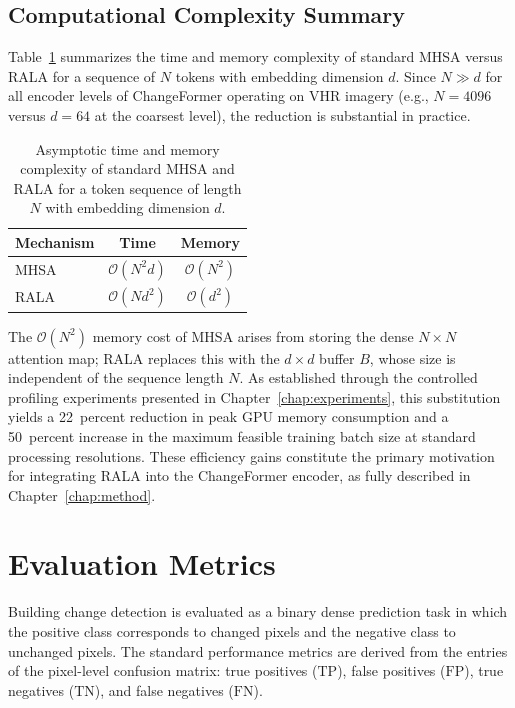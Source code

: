 \subsection{Computational Complexity Summary}

Table~\ref{tab:complexity} summarizes the time and memory complexity of standard \ac{MHSA} versus \ac{RALA} for a sequence of $N$ tokens with embedding dimension $d$. Since $N \gg d$ for all encoder levels of ChangeFormer operating on \ac{VHR} imagery (e.g., $N = 4096$ versus $d = 64$ at the coarsest level), the reduction is substantial in practice.

\begin{table}[ht]
\centering
\caption{Asymptotic time and memory complexity of standard MHSA and RALA for a token sequence of length $N$ with embedding dimension $d$.}
\label{tab:complexity}
\begin{tabularx}{0.75\textwidth}{Xcc}
\hline
\textbf{Mechanism} & \textbf{Time} & \textbf{Memory} \\
\hline
MHSA \cite{Vaswani2017Attention}  & $\mathcal{O}(N^2 d)$ & $\mathcal{O}(N^2)$ \\
RALA \cite{Fan2025RALA}           & $\mathcal{O}(N d^2)$ & $\mathcal{O}(d^2)$ \\
\hline
\end{tabularx}
\end{table}

The $\mathcal{O}(N^2)$ memory cost of \ac{MHSA} arises from storing the dense $N \times N$ attention map; \ac{RALA} replaces this with the $d \times d$ buffer $B$, whose size is independent of the sequence length $N$. As established through the controlled profiling experiments presented in Chapter~\ref{chap:experiments}, this substitution yields a 22~percent reduction in peak \ac{GPU} memory consumption and a 50~percent increase in the maximum feasible training batch size at standard processing resolutions. These efficiency gains constitute the primary motivation for integrating \ac{RALA} into the ChangeFormer encoder, as fully described in Chapter~\ref{chap:method}.


\section{Evaluation Metrics}
\label{sec:metrics}

Building change detection is evaluated as a binary dense prediction task in which the positive class corresponds to changed pixels and the negative class to unchanged pixels. The standard performance metrics are derived from the entries of the pixel-level confusion matrix: true positives ($\mathrm{TP}$), false positives ($\mathrm{FP}$), true negatives ($\mathrm{TN}$), and false negatives ($\mathrm{FN}$).


